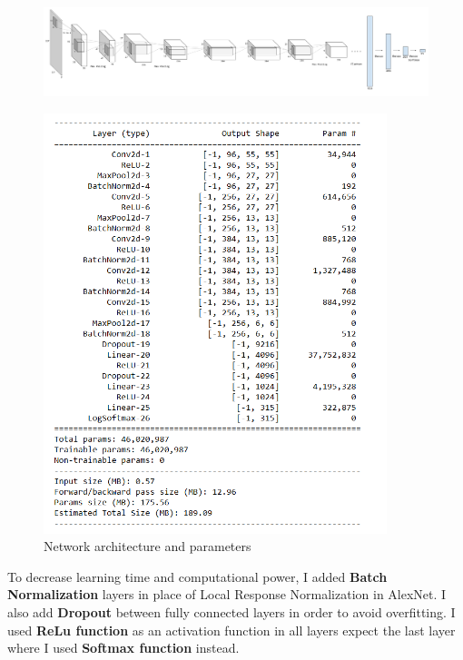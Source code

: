 \documentclass[runningheads]{llncs}
\begin{document}
\begin{figure}[H]
    \centering
    \includegraphics[width=\textwidth]{Figures/Model architecture.png}
\end{figure}
\begin{figure}[H]
    \centering
    \includegraphics[width=10cm]{Figures/model summary.png}
    \caption{Network architecture and parameters}
    \label{fig:network}
\end{figure}
To decrease learning time and computational power, I added \textbf{Batch Normalization} layers in place of Local Response Normalization in AlexNet. I also add \textbf{Dropout} between fully connected layers in order to avoid overfitting. I used \textbf{ReLu function} as an activation function in all layers expect the last layer where I used \textbf{Softmax function} instead.
\end{document}
